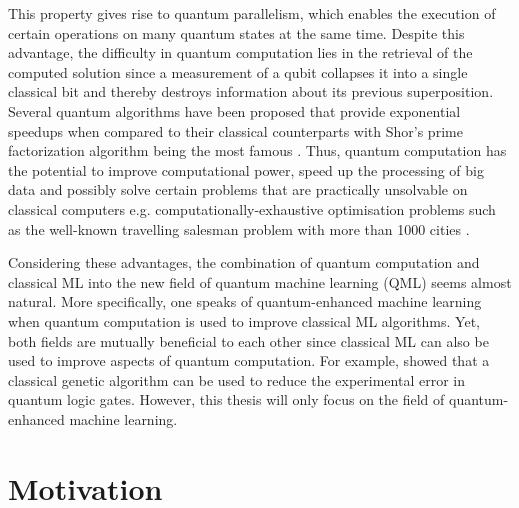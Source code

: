 This property gives rise to quantum parallelism, which enables the execution of certain operations on many quantum states at the same time. Despite this advantage, the difficulty in quantum computation lies in the retrieval of the computed solution since a measurement of a qubit collapses it into a single classical bit and thereby destroys information about its previous superposition. Several quantum algorithms have been proposed that provide exponential speedups when compared to their classical counterparts with Shor's prime factorization algorithm being the most famous \cite{shor1994}.
Thus, quantum computation has the potential to improve computational power, speed up the processing of big data and possibly solve certain problems that are practically unsolvable on classical computers e.g. computationally-exhaustive optimisation problems such as the well-known travelling salesman problem with more than 1000 cities \cite{kieu2006quantum}.


Considering these advantages, the combination of quantum computation and classical ML into the new field of quantum machine learning (QML) seems almost natural. More specifically, one speaks of quantum-enhanced machine learning when quantum computation is used to improve classical ML algorithms. Yet, both fields are mutually beneficial to each other since classical ML can also be used to improve aspects of quantum computation. For example,  showed that a classical genetic algorithm can be used to reduce the experimental error in quantum logic gates. However, this thesis will only focus on the field of quantum-enhanced machine learning.


\section{Motivation}
\label{sec:motivation}

